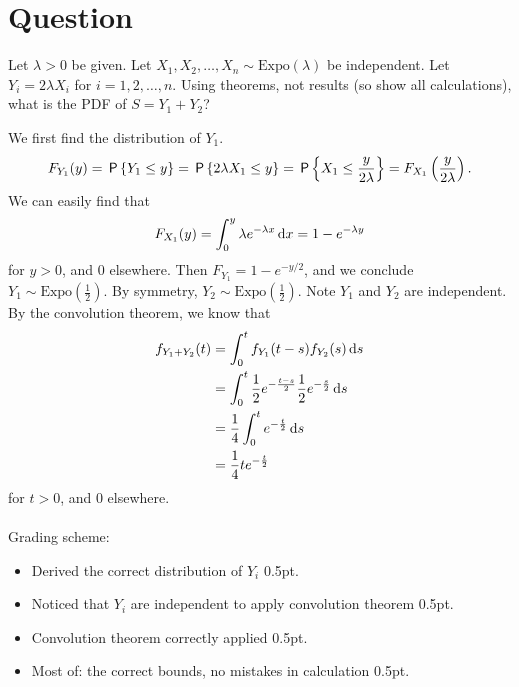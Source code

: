 \section{Question}

\begin{exercise}[2]
Let $\lambda>0$ be given. Let $X_1,X_2,\dots,X_n \sim\text{Expo}(\lambda)$ be independent. Let $Y_i = 2\lambda X_i$ for $i=1,2,\dots,n$. Using theorems, not results (so show all calculations), what is the PDF of $S = Y_1 + Y_2$?
\begin{solution}
We first find the distribution of $Y_1$.
\begin{align*}
    F_{Y_1}(y) = \P{Y_1\leq y} = \P{2\lambda X_1\leq y} = \P{X_1\leq \frac{y}{2\lambda}} = F_{X_1}\left(\frac{y}{2\lambda}\right).
\end{align*}
We can easily find that
\begin{align*}
    F_{X_1}(y) = \int_0^y{\lambda e^{-\lambda x} \d x} = 1- e^{-\lambda y}
\end{align*}
for $y>0$, and 0 elsewhere. Then $F_{Y_1} = 1- e^{- y/2}$, and we conclude $Y_1\sim\text{Expo}(\frac12)$. By symmetry, $Y_2\sim\text{Expo}(\frac12)$. Note $Y_1$ and $Y_2$ are independent. By the convolution theorem, we know that
\begin{align*}
    f_{Y_1+Y_2}(t) &= \int_0^t{f_{Y_1}(t-s)f_{Y_2}(s) \d s}\\
    &= \int_0^t{\frac12 e^{-\frac{t-s}{2}}\frac12 e^{-\frac s 2} \d s}\\
    &= \frac14\int_0^t{e^{-\frac t 2} \d s}\\
    &= \frac14 t e^{-\frac t 2}
\end{align*}
for $t>0$, and 0 elsewhere.
\\\\
Grading scheme:
\begin{itemize}
    \item Derived the correct distribution of $Y_i$ 0.5pt.
    \item Noticed that $Y_i$ are independent to apply convolution theorem 0.5pt.
    \item Convolution theorem correctly applied 0.5pt.
    \item Most of: the correct bounds, no mistakes in calculation 0.5pt.
\end{itemize}
\end{solution}
\end{exercise}

